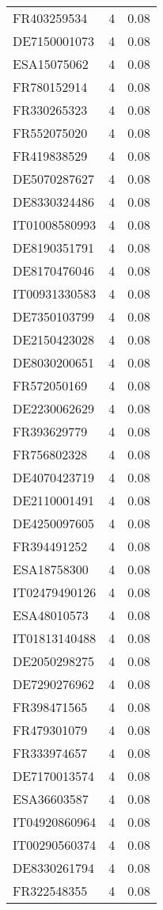 \begin{table*}[htbp]
\begin{tabular}{lrr}
FR403259534 & 4 & 0.08 \\
DE7150001073 & 4 & 0.08 \\
ESA15075062 & 4 & 0.08 \\
FR780152914 & 4 & 0.08 \\
FR330265323 & 4 & 0.08 \\
FR552075020 & 4 & 0.08 \\
FR419838529 & 4 & 0.08 \\
DE5070287627 & 4 & 0.08 \\
DE8330324486 & 4 & 0.08 \\
IT01008580993 & 4 & 0.08 \\
DE8190351791 & 4 & 0.08 \\
DE8170476046 & 4 & 0.08 \\
IT00931330583 & 4 & 0.08 \\
DE7350103799 & 4 & 0.08 \\
DE2150423028 & 4 & 0.08 \\
DE8030200651 & 4 & 0.08 \\
FR572050169 & 4 & 0.08 \\
DE2230062629 & 4 & 0.08 \\
FR393629779 & 4 & 0.08 \\
FR756802328 & 4 & 0.08 \\
DE4070423719 & 4 & 0.08 \\
DE2110001491 & 4 & 0.08 \\
DE4250097605 & 4 & 0.08 \\
FR394491252 & 4 & 0.08 \\
ESA18758300 & 4 & 0.08 \\
IT02479490126 & 4 & 0.08 \\
ESA48010573 & 4 & 0.08 \\
IT01813140488 & 4 & 0.08 \\
DE2050298275 & 4 & 0.08 \\
DE7290276962 & 4 & 0.08 \\
FR398471565 & 4 & 0.08 \\
FR479301079 & 4 & 0.08 \\
FR333974657 & 4 & 0.08 \\
DE7170013574 & 4 & 0.08 \\
ESA36603587 & 4 & 0.08 \\
IT04920860964 & 4 & 0.08 \\
IT00290560374 & 4 & 0.08 \\
DE8330261794 & 4 & 0.08 \\
FR322548355 & 4 & 0.08 \\

\end{tabular}
\end{table*}
